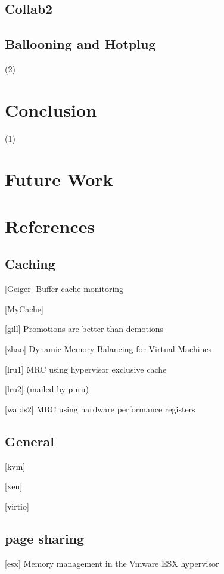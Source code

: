 \documentclass[10pt,a4paper]{article}
\begin{document}
\subsection{Collab2}

\subsection{Ballooning and Hotplug}

   (2)
\section{Conclusion}

   (1)
\section{Future Work}

  
\section{References}


\subsection{Caching}

[Geiger] Buffer cache monitoring 

[MyCache]

[gill] Promotions are better than demotions

[zhao] Dynamic Memory Balancing for Virtual Machines

[lru1] MRC using hypervisor exclusive cache

[lru2] (mailed by puru)

[walds2] MRC using hardware performance registers 

\subsection{General}

[kvm]

[xen]

[virtio]


\subsection{page sharing}

[esx] Memory management in the Vmware ESX hypervisor 
\end{document}
